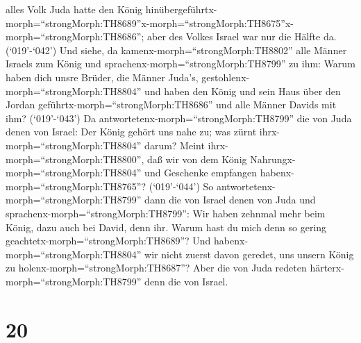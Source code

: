 alles Volk Juda hatte den König
hinübergeführtx-morph=``strongMorph:TH8689''\textbar x-morph=``strongMorph:TH8675''x-morph=``strongMorph:TH8686'';
aber des Volkes Israel war nur die Hälfte da. 
(`019'-`042') Und siehe, da kamenx-morph=``strongMorph:TH8802'' alle
Männer Israels zum König und sprachenx-morph=``strongMorph:TH8799'' zu
ihm: Warum haben dich unsre Brüder, die Männer Juda's,
gestohlenx-morph=``strongMorph:TH8804'' und haben den König und sein
Haus über den Jordan geführtx-morph=``strongMorph:TH8686'' und alle
Männer Davids mit ihm?  (`019'-`043') Da
antwortetenx-morph=``strongMorph:TH8799'' die von Juda denen von Israel:
Der König gehört uns nahe zu; was zürnt
ihrx-morph=``strongMorph:TH8804'' darum? Meint
ihrx-morph=``strongMorph:TH8800'', daß wir von dem König
Nahrungx-morph=``strongMorph:TH8804'' und Geschenke empfangen
habenx-morph=``strongMorph:TH8765''?  (`019'-`044') So
antwortetenx-morph=``strongMorph:TH8799'' dann die von Israel denen von
Juda und sprachenx-morph=``strongMorph:TH8799'': Wir haben zehnmal mehr
beim König, dazu auch bei David, denn ihr. Warum hast du mich denn so
gering geachtetx-morph=``strongMorph:TH8689''? Und
habenx-morph=``strongMorph:TH8804'' wir nicht zuerst davon geredet, uns
unsern König zu holenx-morph=``strongMorph:TH8687''? Aber die von Juda
redeten härterx-morph=``strongMorph:TH8799'' denn die von Israel.

\hypertarget{section-19}{%
\section{20}\label{section-19}}

